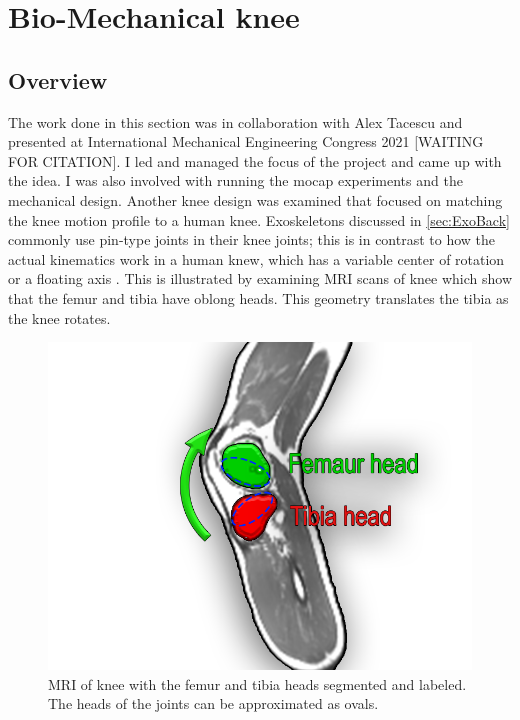 \section{Bio-Mechanical knee}

\subsection{Overview}
The work done in this section was in collaboration with Alex Tacescu \cite{tacescu2021development} and presented at International Mechanical Engineering Congress 2021 [WAITING FOR CITATION]. I led and managed the focus of the project and came up with the idea. I was also involved with running the mocap experiments and the mechanical design. Another knee design was examined that focused on matching the knee motion profile to a human knee. Exoskeletons discussed in \autoref{sec:ExoBack} commonly use pin-type joints in their knee joints; this is in contrast to how the actual kinematics work in a human knew, which has a variable center of rotation or a floating axis \cite{morrison1970mechanics} \cite{koo2008knee} \cite{grood1983joint}.  This is illustrated by examining MRI scans of knee which show that the femur and tibia have oblong heads\cite{MRIKneeScan}. This geometry translates the tibia as the knee rotates. 




\begin{figure}[h!]
    \centering
    \includegraphics[scale=0.5]{images/mech_design/MRI_knee_label.png}
    \caption[Labled MRI of knee]{MRI of knee with the femur and tibia heads segmented and labeled. The heads of the joints can be approximated as ovals. }
    \label{fig:MRIKnee}
\end{figure}

